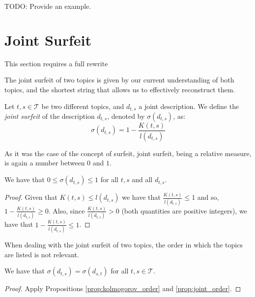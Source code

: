 \begin{example}
\label{ex:surfeit_non_comparison}
{\color{red} TODO: Provide an example.}
\end{example}

%
%

\section{Joint Surfeit}

{\color{red} This section requires a full rewrite}

The joint surfeit of two topics is given by our current understanding of both topics, and the shortest string that allows us to effectively reconstruct them.

\begin{definition}
Let $t,s \in \mathcal{T}$ be two different topics, and $d_{t,s}$ a joint description. We define the \emph{joint surfeit} of the description $d_{t,s}$, denoted by $\sigma(d_{t,s})$, as: 
\[
\sigma(d_{t,s}) = 1 - \frac{K(t, s)}{l \left( d_{t,s} \right)}
\]
\end{definition}

As it was the case of the concept of surfeit, joint surfeit, being a relative measure, is again a number between $0$ and $1$.

\begin{proposition}
We have that $0 \leq \sigma(d_{t,s}) \leq 1$ for all $t,s$ and all $d_{t,s}$.
\end{proposition}
\begin{proof}
Given that $K(t,s) \leq l(d_{t,s})$ we have that $\frac{K(t, s)}{l \left( d_{t,s} \right)} \leq 1$ and so, $1 - \frac{K(t, s)}{l \left( d_{t,s} \right)} \geq 0$. Also, since $\frac{K(t, s)}{l \left( d_{t,s} \right)} > 0$ (both quantities are positive integers), we have that $1 - \frac{K(t, s)}{l \left( d_{t,s} \right)} \leq 1$.
\end{proof}

When dealing with the joint surfeit of two topics, the order in which the topics are listed is not relevant.

\begin{proposition}
We have that $\sigma(d_{t,s}) = \sigma(d_{s,t})$ for all $t,s \in \mathcal{T}$.
\end{proposition}
\begin{proof}
Apply Propositions \ref{prop:kolmogorov_order} and \ref{prop:joint_order}.
\end{proof}

